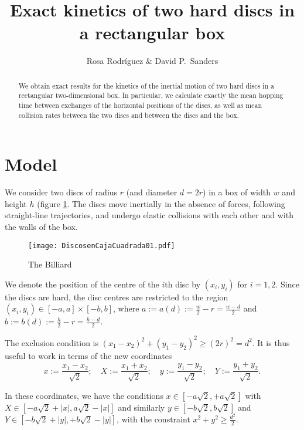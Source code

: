 \documentclass[a4paper,10pt]{article}
\title{Exact kinetics of two hard discs in a rectangular box}
\author{Rosa Rodríguez \& David P.~Sanders}
\newcommand{\defeq}{:=}
\begin{document}
\maketitle
\begin{abstract}
  We obtain exact results for the kinetics of the inertial motion of two hard discs in a rectangular two-dimensional box.
  In particular, we calculate exactly the mean hopping time between exchanges of the horizontal positions of the discs, as well as mean collision rates between the two discs and between the discs and the box. 
\end{abstract}

\section{Model}

We consider two discs of radius $r$ (and diameter $d=2r$) in a box of width $w$ and height $h$ (figure
\ref{billar01}. The discs move inertially in the absence of forces, following straight-line trajectories, and undergo elastic collisions with each other and with the walls of the box.

\begin{figure}
  \centering
  \texttt{[image: DiscosenCajaCuadrada01.pdf]}
  \caption{The Billiard}\label{billar01}
\end{figure}


We denote the position of the centre of the $i$th disc by $(x_{i}, y_{i})$ for $i=1,2$. Since the discs are hard, the disc centres are restricted to the region $(x_i, y_i) \in [-a,a] \times [-b, b]$, where $a \defeq a(d) \defeq \frac{w}{2} - r = \frac{w-d}{2}$ and $b \defeq b(d) \defeq \frac{h}{2} - r = \frac{h-d}{2}$.

The exclusion condition is $(x_1-x_2)^2 + (y_1-y_2)^2 \ge (2r)^2 = d^2$.
It is thus useful to work in terms of the new coordinates
\begin{equation}\label{cambiocoor01}
 x \defeq \frac{x_1 - x_2}{\sqrt{2}}; 
\quad X \defeq \frac{x_1 + x_2}{\sqrt{2}}; 
\quad y \defeq \frac{y_1 - y_2}{\sqrt{2}}; 
\quad Y \defeq \frac{y_1 + y_2}{\sqrt{2}}.
\end{equation}


In these coordinates, we have the conditions $x \in [-a \sqrt{2}, +a \sqrt{2}]$ with $X \in [-a \sqrt{2} + |x|, a \sqrt{2} - |x|]$ and similarly $y \in [-b \sqrt{2}, b \sqrt{2}]$ and $Y \in [-b \sqrt{2} + |y|, +b \sqrt{2} - |y|]$,  with the constraint $x^2 + y^2 \ge \frac{d^2}{2}$.
\end{document}
